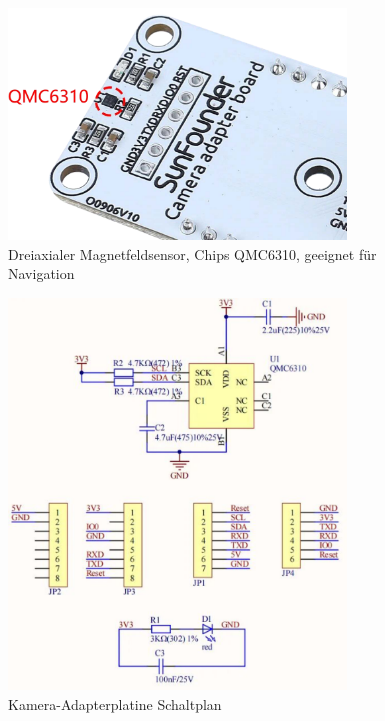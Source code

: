 \documentclass{vorlage-design-main}
\begin{document}
\begin{figure}
\centering
\includegraphics[width=0.8\textwidth]{images/cam_adapter_qmc6310.pdf}
\floatnotes{}
\caption{Dreiaxialer Magnetfeldsensor, Chips QMC6310, geeignet für
Navigation}
\end{figure}

\begin{figure}
\centering
\includegraphics[width=0.8\textwidth]{images/cam_adapter_sche.pdf}
\floatnotes{}
\caption{Kamera-Adapterplatine Schaltplan}
\end{figure}
\end{document}

